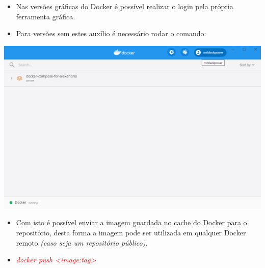 \documentclass[10pt]{beamer}
\theoremstyle{remark}
\theoremstyle{definition}
\newcommand{\code}[1]{\textcolor{red} {\textit{#1}}} %
\begin{document}
\begin{frame}[allowframebreaks]
\begin{itemize}
		\item Nas versões gráficas do Docker é possível realizar o login pela própria ferramenta gráfica.
		
		\item Para versões sem estes auxílio é necessário rodar o comando:
		
%		
	\end{itemize}
	
	\framebreak
			
	\begin{center}
		\includegraphics[width=1\textwidth]{images/16.png}
	\end{center}
	
	\framebreak
	
	\begin{itemize}
		\item Com isto é possível enviar a imagem guardada no cache do Docker para o repositório, desta forma a imagem pode ser utilizada em qualquer Docker remoto \textit{(caso seja um repositório público)}.
		
		\item \code{docker push <image:tag>}
		
	\end{itemize}
	
	\framebreak
	

\end{frame}
\end{document}
